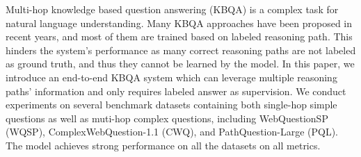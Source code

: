 Multi-hop knowledge based question answering (KBQA) is a complex task for natural language understanding. Many KBQA approaches have been proposed in recent years, and most of them are trained based on labeled reasoning path. This hinders the system's performance as many correct reasoning paths are not labeled as ground truth, and thus they cannot be learned by the model. In this paper, we introduce an end-to-end KBQA system which can leverage multiple reasoning paths' information and only requires labeled answer as supervision. We conduct experiments on several benchmark datasets containing both single-hop simple questions as well as muti-hop complex questions, including WebQuestionSP (WQSP), ComplexWebQuestion-1.1 (CWQ), and PathQuestion-Large (PQL). The model achieves strong performance on all the datasets on all metrics.